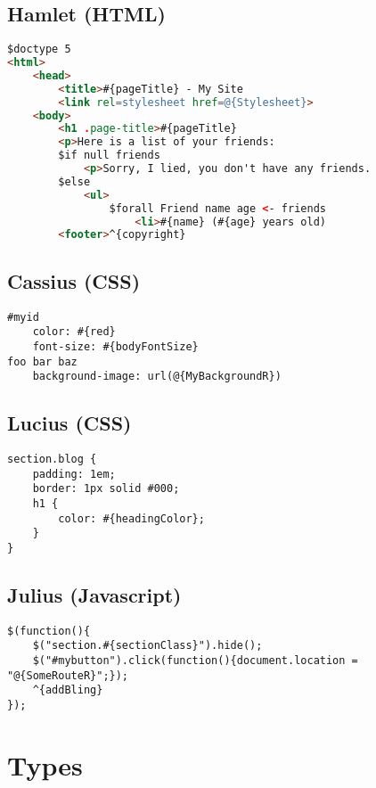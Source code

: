 \subsection{Hamlet (HTML)}

\begin{lstlisting}[language=HTML]
$doctype 5
<html>
    <head>
        <title>#{pageTitle} - My Site
        <link rel=stylesheet href=@{Stylesheet}>
    <body>
        <h1 .page-title>#{pageTitle}
        <p>Here is a list of your friends:
        $if null friends
            <p>Sorry, I lied, you don't have any friends.
        $else
            <ul>
                $forall Friend name age <- friends
                    <li>#{name} (#{age} years old)
        <footer>^{copyright}
\end{lstlisting}

\subsection{Cassius (CSS)}

\begin{lstlisting}
#myid
    color: #{red}
    font-size: #{bodyFontSize}
foo bar baz
    background-image: url(@{MyBackgroundR})
\end{lstlisting}

\subsection{Lucius (CSS)}

\begin{lstlisting}
section.blog {
    padding: 1em;
    border: 1px solid #000;
    h1 {
        color: #{headingColor};
    }
}
\end{lstlisting}

\subsection{Julius (Javascript)}

\begin{lstlisting}
$(function(){
    $("section.#{sectionClass}").hide();
    $("#mybutton").click(function(){document.location = "@{SomeRouteR}";});
    ^{addBling}
});
\end{lstlisting}

\section{Types}

